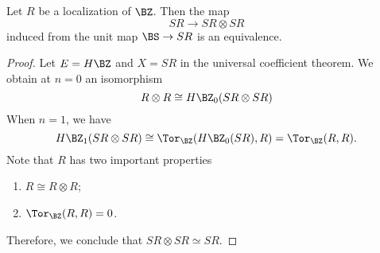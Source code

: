 \begin{corollary}
Let $R$ be a localization of $\BZ$.
	Then the map
	\[
	SR\to SR\otimes SR
	\]
	induced from the unit map $\BS \to SR$ is an equivalence.
\end{corollary}
\begin{proof}
	Let $E=H\BZ$ and $X=SR$ in the universal coefficient theorem. We obtain at $n=0$
	an isomorphism
	$$
	R\otimes R \cong H\BZ_0(SR \otimes SR)
	$$
	When $n= 1$, we have
	\[
	H\BZ_1(SR \otimes SR) \cong \Tor_\BZ(H\BZ_{0}(SR),R)=\Tor_\BZ(R,R).
	\]
	Note that $R$ has two important properties
	\begin{enumerate}
		\item $R\cong R\otimes R$;
		\item $\Tor_{\BZ}(R,R)=0$.
	\end{enumerate}
	Therefore, we conclude that $SR\otimes SR\simeq SR$. 
\end{proof}


